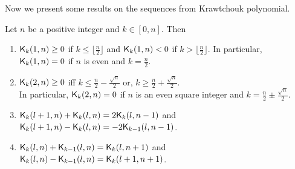 \documentclass{llncs}
\begin{document}
Now we present some results on the sequences from Krawtchouk polynomial.
\begin{lemma}\label{lem:KProp}
Let $n$ be a positive integer and $k \in [0,n]$. Then
\begin{enumerate}
\item\label{itm:l1} $\mathsf{K}_{k}(1,n) \geq 0$ if $k \leq \lfloor\frac{n}{2}\rfloor$ and $\mathsf{K}_{k}(1,n) < 0$ if $k > \lfloor\frac{n}{2}\rfloor$.
In particular, $\mathsf{K}_{k}(1,n) = 0$ if $n$ is even and $k = \frac{n}{2}$.
\item \label{itm:l2} $\mathsf{K}_{k}(2,n) \geq 0$ iff $k \leq \frac{n}{2} - \frac{\sqrt{n}}{2}$ or, $k \geq \frac{n}{2} + \frac{\sqrt{n}}{2}$.\\
In particular, $\mathsf{K}_{k}(2,n) = 0$ if $n$ is an even square integer and $k = \frac{n}{2} \pm \frac{\sqrt{n}}{2}$.
\item\label{itm:ksd} $\mathsf{K}_{k}(l+1,n) + \mathsf{K}_{k}(l,n) = 2\mathsf{K}_{k}(l,n-1)$
and $\mathsf{K}_{k}(l+1,n) - \mathsf{K}_{k}(l,n) = -2\mathsf{K}_{k-1}(l,n-1)$.
\item \label{itm:ksd2} $\mathsf{K}_{k}(l,n) + \mathsf{K}_{k-1}(l,n) = \mathsf{K}_{k}(l,n+1)$ and $\mathsf{K}_{k}(l,n) - \mathsf{K}_{k-1}(l,n) = \mathsf{K}_{k}(l+1,n+1)$.
\end{enumerate}
\end{lemma}
\end{document}
